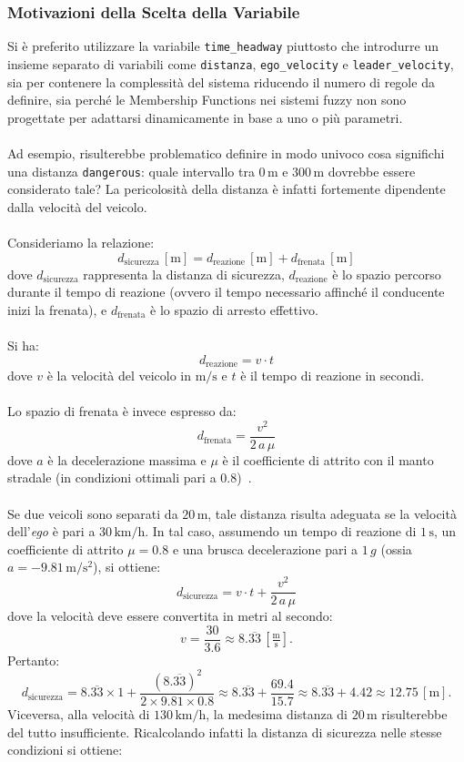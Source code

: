 \subsubsection{Motivazioni della Scelta della Variabile} 
Si è preferito utilizzare la variabile \texttt{time\_headway} piuttosto che introdurre un insieme separato di variabili come 
\texttt{distanza}, \texttt{ego\_velocity} e \texttt{leader\_velocity}, sia per contenere la complessità del sistema riducendo 
il numero di regole da definire, sia perché le Membership Functions nei sistemi fuzzy non sono progettate per adattarsi 
dinamicamente in base a uno o più parametri.
\\\\
Ad esempio, risulterebbe problematico definire in modo univoco cosa significhi una distanza \texttt{dangerous}: quale intervallo 
tra \(0\,\mathrm{m}\) e \(300\,\mathrm{m}\) dovrebbe essere considerato tale? La pericolosità della distanza è infatti fortemente 
dipendente dalla velocità del veicolo.
\\\\
Consideriamo la relazione:
\begin{equation}
  d_{\mathrm{sicurezza}}\,[\mathrm{m}] = d_{\mathrm{reazione}}\,[\mathrm{m}] + d_{\mathrm{frenata}}\,[\mathrm{m}]
  \label{eq:d_sicurezza}
\end{equation}
\noindent dove \(d_{\mathrm{sicurezza}}\) rappresenta la distanza di sicurezza, \(d_{\mathrm{reazione}}\) è lo spazio percorso durante il tempo di reazione (ovvero il tempo necessario affinché il conducente inizi la frenata), e \(d_{\mathrm{frenata}}\) è lo spazio di arresto effettivo.
\\\\
Si ha:
\[
d_{\mathrm{reazione}} = v \cdot t
\]
dove \(v\) è la velocità del veicolo in \(\mathrm{m/s}\) e \(t\) è il tempo di reazione in secondi.
\\\\
Lo spazio di frenata è invece espresso da:
\[
d_{\mathrm{frenata}} = \frac{v^2}{2\,a\,\mu}
\]
dove \(a\) è la decelerazione massima e \(\mu\) è il coefficiente di attrito con il manto stradale (in condizioni ottimali pari a 0.8)~\cite{distanza_di_sicurezza_youmath}.
\\\\
Se due veicoli sono separati da \(20\,\mathrm{m}\), tale distanza risulta adeguata se la velocità 
dell'\emph{ego} è pari a \(30\,\mathrm{km/h}\). In tal caso, assumendo un tempo di reazione di \(1\,\mathrm{s}\), 
un coefficiente di attrito \(\mu=0.8\) e una brusca decelerazione pari a \(1\,g\) (ossia \(a = -9.81\,\mathrm{m/s^2}\)), si ottiene:
\[
d_{\mathrm{sicurezza}} = v \cdot t + \frac{v^2}{2\,a\,\mu}
\]
dove la velocità deve essere convertita in metri al secondo:
\[
v = \frac{30}{3.6} \approx 8.\overline{33}\,\left[\tfrac{\mathrm{m}}{\mathrm{s}}\right].
\]
Pertanto:
\[
d_{\mathrm{sicurezza}} = 8.\overline{33} \times 1 + \frac{(8.\overline{33})^2}{2 \times 9.81 \times 0.8} \approx 8.\overline{33} + \frac{69.4}{15.7} \approx 8.\overline{33} + 4.42 \approx 12.75\,[\mathrm{m}].
\]
Viceversa, alla velocità di \(130\,\mathrm{km/h}\), la medesima distanza di \(20\,\mathrm{m}\) risulterebbe del tutto insufficiente. 
Ricalcolando infatti la distanza di sicurezza nelle stesse condizioni si ottiene:


